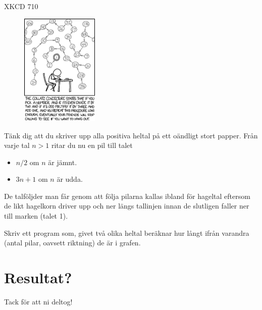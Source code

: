 \documentclass[10pt]{beamer}
\begin{document}
\begin{frame}[fragile]{XKCD 710}

\begin{figure}
\includegraphics[width=0.33\textwidth]{collatz_conjecture}
\end{figure}

Tänk dig att du skriver upp alla positiva heltal på ett oändligt stort papper. Från varje tal $n>1$ ritar du nu en pil till talet

\begin{itemize}
\item $n/2$ om $n$ är jämnt.
\item $3n+1$ om $n$ är udda.
\end{itemize}

De talföljder man får genom att följa pilarna kallas ibland för hageltal eftersom de likt hagelkorn driver upp och ner längs tallinjen innan de slutligen faller ner till marken (talet 1). 

Skriv ett program som, givet två olika heltal beräknar hur långt ifrån varandra (antal pilar, oavsett riktning) de är i grafen. 
\end{frame}




\section{Resultat?}


{
\begin{frame}[standout]
  Tack för att ni deltog!
\end{frame}
}
\end{document}
